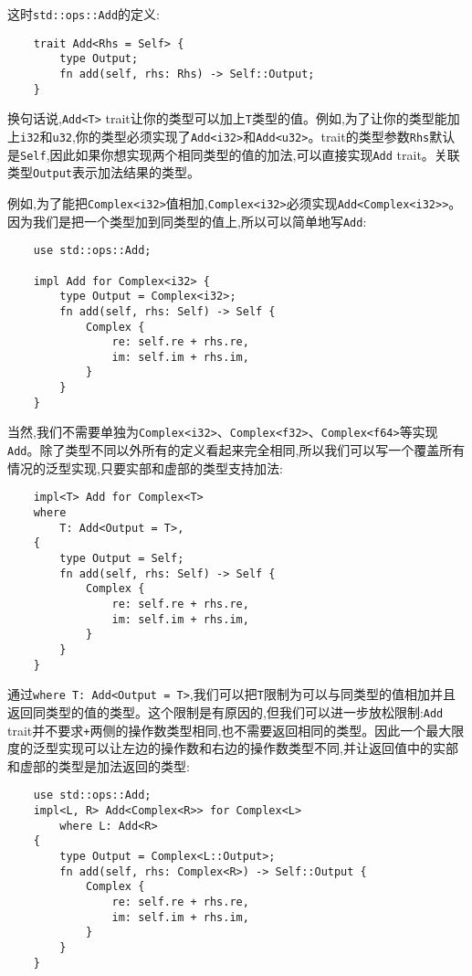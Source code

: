 这时\texttt{std::ops::Add}的定义:
\begin{verbatim}
    trait Add<Rhs = Self> {
        type Output;
        fn add(self, rhs: Rhs) -> Self::Output;
    }
\end{verbatim}

换句话说,\texttt{Add<T>} trait让你的类型可以加上\texttt{T}类型的值。例如,为了让你的类型能加上\texttt{i32}和\texttt{u32},你的类型必须实现了\texttt{Add<i32>}和\texttt{Add<u32>}。trait的类型参数\texttt{Rhs}默认是\texttt{Self},因此如果你想实现两个相同类型的值的加法,可以直接实现\texttt{Add} trait。关联类型\texttt{Output}表示加法结果的类型。

例如,为了能把\texttt{Complex<i32>}值相加,\texttt{Complex<i32>}必须实现\texttt{Add<Complex<i32>>}。因为我们是把一个类型加到同类型的值上,所以可以简单地写\texttt{Add}:
\begin{verbatim}
    use std::ops::Add;

    impl Add for Complex<i32> {
        type Output = Complex<i32>;
        fn add(self, rhs: Self) -> Self {
            Complex {
                re: self.re + rhs.re,
                im: self.im + rhs.im,
            }
        }
    }
\end{verbatim}

当然,我们不需要单独为\texttt{Complex<i32>}、\texttt{Complex<f32>}、\texttt{Complex<f64>}等实现\texttt{Add}。除了类型不同以外所有的定义看起来完全相同,所以我们可以写一个覆盖所有情况的泛型实现,只要实部和虚部的类型支持加法:
\begin{verbatim}
    impl<T> Add for Complex<T>
    where
        T: Add<Output = T>,
    {
        type Output = Self;
        fn add(self, rhs: Self) -> Self {
            Complex {
                re: self.re + rhs.re,
                im: self.im + rhs.im,
            }
        }
    }
\end{verbatim}

通过\texttt{where T: Add<Output = T>},我们可以把\texttt{T}限制为可以与同类型的值相加并且返回同类型的值的类型。这个限制是有原因的,但我们可以进一步放松限制:\texttt{Add} trait并不要求\texttt{+}两侧的操作数类型相同,也不需要返回相同的类型。因此一个最大限度的泛型实现可以让左边的操作数和右边的操作数类型不同,并让返回值中的实部和虚部的类型是加法返回的类型:
\begin{verbatim}
    use std::ops::Add;
    impl<L, R> Add<Complex<R>> for Complex<L>
        where L: Add<R>
    {
        type Output = Complex<L::Output>;
        fn add(self, rhs: Complex<R>) -> Self::Output {
            Complex {
                re: self.re + rhs.re,
                im: self.im + rhs.im,
            }
        }
    }
\end{verbatim}

